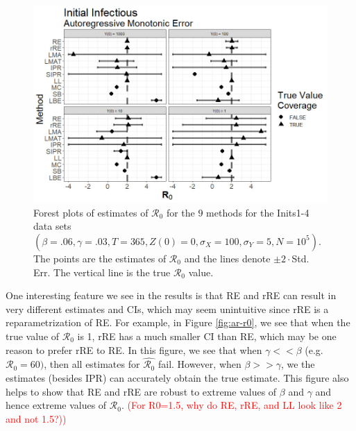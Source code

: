 \documentclass[12pt]{article}
\newcommand{\com}[1]{\textcolor{red}{ #1}}
\newcommand{\xxsir}{\ensuremath{9} } %
\newcommand{\rr}{\ensuremath{\mathcal{R}_0}}
\begin{document}
\begin{figure}[H]
	\centering
	\includegraphics[scale=0.5]{images/start_arm.jpg}
	\caption{Forest plots of estimates of $\rr$ for the \xxsir methods for the Inits1-4 data sets $(\beta=.06, \gamma=.03, T=365,  Z(0)=0, \sigma_X=100, \sigma_Y=5, N=10^5)$.  The points are the estimates of $\rr$ and the lines denote $\pm 2\cdot $Std. Err.  The vertical line is the true $\rr$ value.}\label{fig:ar-small-I}
\end{figure}

One interesting feature we see in the results is that RE and rRE can result in very different estimates and CIs, which may seem unintuitive since rRE is a reparametrization of RE.  For example, in Figure \ref{fig:ar-r0}, we see that when the true value of $\rr$ is 1, rRE has a much smaller CI than RE, which may be one reason to prefer rRE to RE.  In this figure, we see that when $\gamma << \beta$ (e.g. $\rr=60)$, then all estimates for $\hat{\rr}$ fail.  However, when $\beta >> \gamma$, we the estimates (besides IPR) can accurately obtain the true estimate. This figure also helps to show that RE and rRE are robust to extreme values of $\beta$ and $\gamma$ and hence extreme values of $\rr$.  \com{(For R0=1.5, why do RE, rRE, and LL look like 2 and not 1.5?))}
\end{document}
